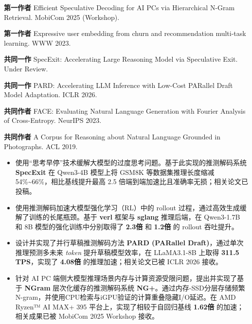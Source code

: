{\fontsize{10pt}{12pt}\selectfont %

\textbf{第一作者} Efficient Speculative Decoding for AI PCs via Hierarchical N-Gram Retrieval. MobiCom 2025 (Workshop).

\textbf{第一作者} Expressive user embedding from churn and recommendation multi-task learning. WWW 2023.

\textbf{共同一作} SpecExit: Accelerating Large Reasoning Model via Speculative Exit. Under Review.

\textbf{共同一作} PARD: Accelerating LLM Inference with Low-Cost PARallel Draft Model Adaptation. ICLR 2026.

\textbf{共同作者} FACE: Evaluating Natural Language Generation with Fourier Analysis of Cross-Entropy. NeurIPS 2023.

\textbf{共同作者} A Corpus for Reasoning about Natural Language Grounded in Photographs. ACL 2019.
}




\begin{itemize}
      \item 使用“思考早停”技术缓解大模型的过度思考问题。基于此实现的推测解码系统 \textbf{SpecExit} 在 Qwen3-4B 模型上将 GSM8K 等数据集推理长度缩减 54\%\textasciitilde66\%，相比基线提升最高 2.5 倍端到端加速比且准确率无损；相关论文已投稿。
      \item 使用推测解码加速大模型强化学习（RL）中的 rollout 过程，通过高效生成缓解了训练的长尾瓶颈。基于 \textbf{verl} 框架与 \textbf{sglang} 推理后端，在 Qwen3-1.7B 和 8B 模型的强化训练中分别取得了 \textbf{2.3倍} 和 \textbf{1.2倍} 的 rollout 吞吐提升。
\end{itemize}


\begin{itemize}
      \item 设计并实现了并行草稿推测解码方法 \textbf{PARD (PARallel Draft)}，通过单次推理预测多未来 \textit{token} 提升草稿模型效率，在 LLaMA3.1-8B 上取得 \textbf{311.5 TPS}，实现了 \textbf{4.08倍} 的推理加速；相关论文已被 ICLR 2026 接收。
      \item 针对 AI PC 端侧大模型推理场景内存与计算资源受限问题，提出并实现了基于 \textbf{NGram} 层次化缓存的推测解码系统 \textbf{NG+}。通过内存-SSD分层存储频繁N-gram，并使用CPU检索与iGPU验证的计算重叠隐藏I/O延迟。在 AMD Ryzen™ AI MAX+ 395 平台上，实现了相较于自回归基线 \textbf{1.62倍} 的加速；相关成果已被 MobiCom 2025 Workshop 接收。
\end{itemize}

